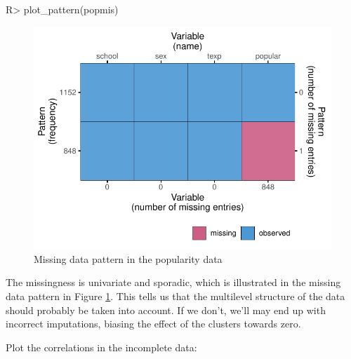 \documentclass[
]{jss}
\begin{document}
\begin{CodeChunk}
\begin{CodeInput}
R> plot_pattern(popmis)
\end{CodeInput}
\begin{figure}

{\centering \includegraphics{Imputation_of_Incomplete_Multilevel_Data_files/figure-latex/pop_pat-1} 

}

\caption[Missing data pattern in the popularity data]{Missing data pattern in the popularity data}\label{fig:pop_pat}
\end{figure}
\end{CodeChunk}

The missingness is univariate and sporadic, which is illustrated in the
missing data pattern in Figure \ref{fig:pop_pat}. This tells us that the
multilevel structure of the data should probably be taken into account.
If we don't, we'll may end up with incorrect imputations, biasing the
effect of the clusters towards zero.

Plot the correlations in the incomplete data:
\end{document}
